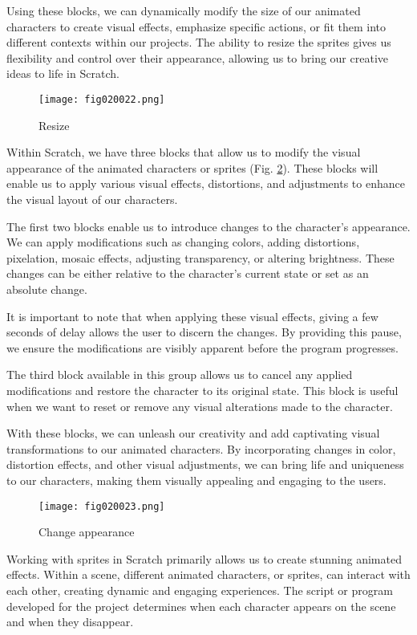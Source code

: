 Using these blocks, we can dynamically modify the size of our animated characters to create visual effects, emphasize specific actions, or fit them into different contexts within our projects. The ability to resize the sprites gives us flexibility and control over their appearance, allowing us to bring our creative ideas to life in Scratch.

\begin{figure}[H]
   \centering
   \texttt{[image: fig020022.png]}
   \caption{Resize}
\label{fig020022}
\end{figure}

Within Scratch, we have three blocks that allow us to modify the visual appearance of the animated characters or sprites (Fig. \ref{fig020023}). These blocks will enable us to apply various visual effects, distortions, and adjustments to enhance the visual layout of our characters.

The first two blocks enable us to introduce changes to the character's appearance. We can apply modifications such as changing colors, adding distortions, pixelation, mosaic effects, adjusting transparency, or altering brightness. These changes can be either relative to the character's current state or set as an absolute change.

It is important to note that when applying these visual effects, giving a few seconds of delay allows the user to discern the changes. By providing this pause, we ensure the modifications are visibly apparent before the program progresses.

The third block available in this group allows us to cancel any applied modifications and restore the character to its original state. This block is useful when we want to reset or remove any visual alterations made to the character.

With these blocks, we can unleash our creativity and add captivating visual transformations to our animated characters. By incorporating changes in color, distortion effects, and other visual adjustments, we can bring life and uniqueness to our characters, making them visually appealing and engaging to the users.

\begin{figure}[H]
   \centering
   \texttt{[image: fig020023.png]}
   \caption{Change appearance}
\label{fig020023}
\end{figure}

Working with sprites in Scratch primarily allows us to create stunning animated effects. Within a scene, different animated characters, or sprites, can interact with each other, creating dynamic and engaging experiences. The script or program developed for the project determines when each character appears on the scene and when they disappear.

